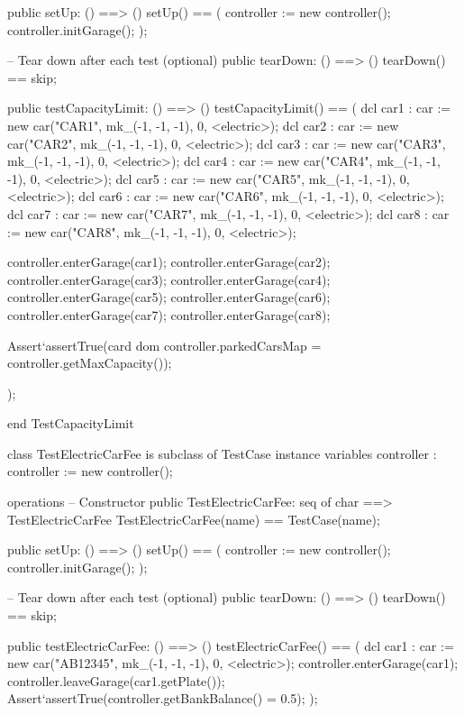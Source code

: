\documentclass[a4paper]{article}
\begin{document}
\begin{vdm_al}
    public setUp: () ==> ()
    setUp() == 
    (
        controller := new controller();
        controller.initGarage();
    );

    -- Tear down after each test (optional)
    public tearDown: () ==> ()
    tearDown() == skip;

    public testCapacityLimit: () ==> ()
    testCapacityLimit() ==
    (
        dcl car1 : car := new car("CAR1", mk_(-1, -1, -1), 0, <electric>);
        dcl car2 : car := new car("CAR2", mk_(-1, -1, -1), 0, <electric>);
        dcl car3 : car := new car("CAR3", mk_(-1, -1, -1), 0, <electric>);
        dcl car4 : car := new car("CAR4", mk_(-1, -1, -1), 0, <electric>);
        dcl car5 : car := new car("CAR5", mk_(-1, -1, -1), 0, <electric>);
        dcl car6 : car := new car("CAR6", mk_(-1, -1, -1), 0, <electric>);
        dcl car7 : car := new car("CAR7", mk_(-1, -1, -1), 0, <electric>);
        dcl car8 : car := new car("CAR8", mk_(-1, -1, -1), 0, <electric>);
        

        controller.enterGarage(car1);
        controller.enterGarage(car2);
        controller.enterGarage(car3);
        controller.enterGarage(car4);
        controller.enterGarage(car5);
        controller.enterGarage(car6);
        controller.enterGarage(car7);
        controller.enterGarage(car8);
        

        Assert`assertTrue(card dom controller.parkedCarsMap = controller.getMaxCapacity());
    
    );

end TestCapacityLimit

class TestElectricCarFee is subclass of TestCase
instance variables
    controller : controller := new controller();

operations
    -- Constructor
    public TestElectricCarFee: seq of char ==> TestElectricCarFee
    TestElectricCarFee(name) == TestCase(name);

    public setUp: () ==> ()
    setUp() == 
    (
        controller := new controller();
        controller.initGarage();
    );

    -- Tear down after each test (optional)
    public tearDown: () ==> ()
    tearDown() == skip;

    public testElectricCarFee: () ==> ()
    testElectricCarFee() ==
    (
        dcl car1 : car := new car("AB12345", mk_(-1, -1, -1), 0, <electric>);
        controller.enterGarage(car1);
        controller.leaveGarage(car1.getPlate());
        Assert`assertTrue(controller.getBankBalance() = 0.5);
    );


\end{vdm_al}
\end{document}
